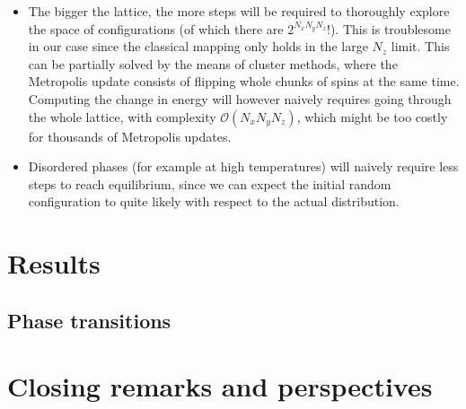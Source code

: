 \documentclass[11pt,openany]{article}
\begin{document}
\begin{itemize}
	
	\item The bigger the lattice, the more steps will be required to thoroughly explore the space of configurations (of which there are $2^{N_xN_yN_z}$!). This is troublesome in our case since the classical mapping only holds in the large $N_z$ limit. This can be partially solved by the means of cluster methods, where the Metropolis update consists of flipping whole chunks of spins at the same time. Computing the change in energy will however naively requires going through the whole lattice, with complexity $\mathcal{O}\left(N_xN_yN_z\right)$, which might be too costly for thousands of Metropolis updates.
	
	\item Disordered phases (for example at high temperatures) will naively require less steps to reach equilibrium, since we can expect the initial random configuration to quite likely with respect to the actual distribution.
	
\end{itemize}


\section{Results}

\subsection{Phase transitions}

\section{Closing remarks and perspectives}


\clearpage\printbibliography
\end{document}
